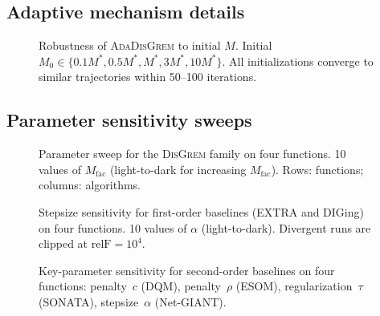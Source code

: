 \documentclass[review,onefignum,onetabnum]{siamart171218}
\begin{document}
\subsection{Adaptive mechanism details}

\begin{figure}[htbp]
	\centering
	\caption{Robustness of \textsc{AdaDisGrem} to initial $M$.
		Initial $M_0\in\{0.1M^*,0.5M^*,M^*,3M^*,10M^*\}$.
		All initializations converge to similar trajectories within
		50--100 iterations.}
	\label{fig:ada_init_m}
\end{figure}

\subsection{Parameter sensitivity sweeps}

\begin{figure}[htbp]
	\centering
	\caption{Parameter sweep for the \textsc{DisGrem} family
		on four functions.
		10 values of $M_{\mathrm{fac}}$ (light-to-dark for increasing
		$M_{\mathrm{fac}}$).
		Rows: functions; columns: algorithms.}
	\label{fig:sweep_disgrem}
\end{figure}

\begin{figure}[htbp]
	\centering
	\caption{Stepsize sensitivity for first-order baselines
		(EXTRA and DIGing) on four functions.
		10 values of $\alpha$ (light-to-dark).
		Divergent runs are clipped at $\mathrm{relF}=10^4$.}
	\label{fig:sweep_first}
\end{figure}

\begin{figure}[htbp]
	\centering
	\caption{Key-parameter sensitivity for second-order baselines
		on four functions: penalty~$c$ (DQM), penalty~$\rho$ (ESOM),
		regularization~$\tau$ (SONATA), stepsize~$\alpha$ (Net-GIANT).}
	\label{fig:sweep_second}
\end{figure}
\end{document}
